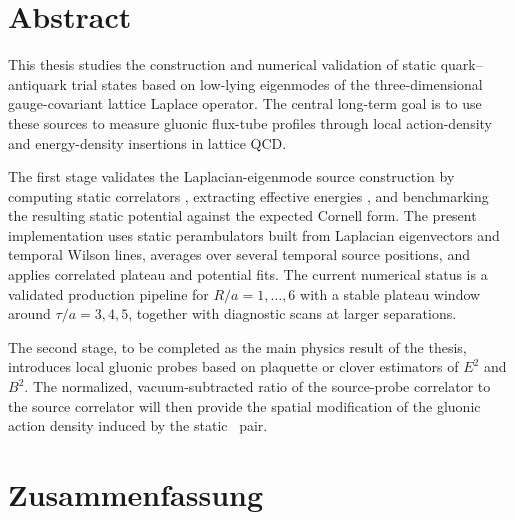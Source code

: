 \chapter*{Abstract}
This thesis studies the construction and numerical validation of static quark--antiquark trial states based on low-lying eigenmodes of the three-dimensional gauge-covariant lattice Laplace operator. The central long-term goal is to use these sources to measure gluonic flux-tube profiles through local action-density and energy-density insertions in lattice QCD.

The first stage validates the Laplacian-eigenmode source construction by computing static correlators \Ls, extracting effective energies \Veff, and benchmarking the resulting static potential against the expected Cornell form. The present implementation uses static perambulators built from Laplacian eigenvectors and temporal Wilson lines, averages over several temporal source positions, and applies correlated plateau and potential fits. The current numerical status is a validated production pipeline for \(R/a=1,\ldots,6\) with a stable plateau window around \(\tau/a=3,4,5\), together with diagnostic scans at larger separations.

The second stage, to be completed as the main physics result of the thesis, introduces local gluonic probes based on plaquette or clover estimators of \(E^2\) and \(B^2\). The normalized, vacuum-subtracted ratio of the source-probe correlator to the source correlator will then provide the spatial modification of the gluonic action density induced by the static \QQbar\ pair.

\chapter*{Zusammenfassung}

